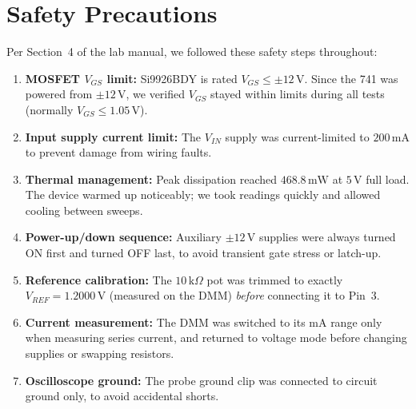 \documentclass[11pt,a4paper]{article}
\begin{document}
\section{Safety Precautions}
Per Section~4 of the lab manual, we followed these safety steps throughout:
\begin{enumerate}[leftmargin=1.5em, itemsep=0.2em]
    \item \textbf{MOSFET $V_{GS}$ limit:} Si9926BDY is rated $V_{GS} \le \pm 12\,\text{V}$. Since the 741 was powered from $\pm 12\,\text{V}$, we verified $V_{GS}$ stayed within limits during all tests (normally $V_{GS} \le 1.05\,\text{V}$).
    \item \textbf{Input supply current limit:} The $V_{IN}$ supply was current-limited to $200\,\text{mA}$ to prevent damage from wiring faults.
    \item \textbf{Thermal management:} Peak dissipation reached $468.8\,\text{mW}$ at $5\,\text{V}$ full load. The device warmed up noticeably; we took readings quickly and allowed cooling between sweeps.
    \item \textbf{Power-up/down sequence:} Auxiliary $\pm 12\,\text{V}$ supplies were always turned ON first and turned OFF last, to avoid transient gate stress or latch-up.
    \item \textbf{Reference calibration:} The $10\,\text{k}\Omega$ pot was trimmed to exactly $V_{REF} = 1.2000\,\text{V}$ (measured on the DMM) \textit{before} connecting it to Pin~3.
    \item \textbf{Current measurement:} The DMM was switched to its mA range only when measuring series current, and returned to voltage mode before changing supplies or swapping resistors.
    \item \textbf{Oscilloscope ground:} The probe ground clip was connected to circuit ground only, to avoid accidental shorts.
\end{enumerate}
\end{document}
